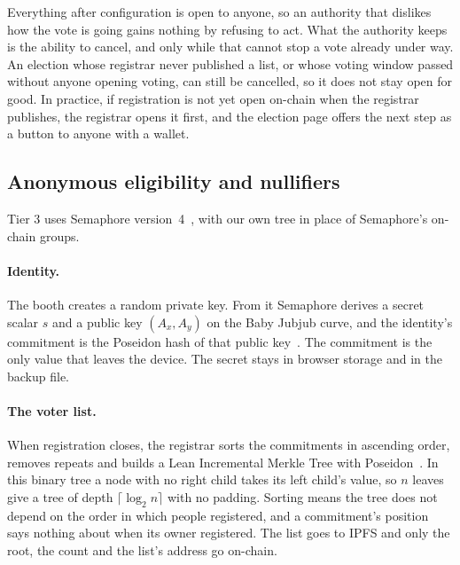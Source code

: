 Everything after configuration is open to anyone, so an authority that
dislikes how the vote is going gains nothing by refusing to act. What the
authority keeps is the ability to cancel, and only while that cannot stop a
vote already under way. An election whose registrar never published a list,
or whose voting window passed without anyone opening voting, can still be
cancelled, so it does not stay open for good. In practice, if registration is
not yet open on-chain when the registrar publishes, the registrar opens it
first, and the election page offers the next step as a button to anyone with a
wallet.

\subsection{Anonymous eligibility and nullifiers}\label{sec:zk}

Tier 3 uses Semaphore version~4~\cite{semaphore}, with our own tree in place of
Semaphore's on-chain groups.

\paragraph{Identity.} The booth creates a random private key. From it
Semaphore derives a secret scalar $s$ and a public key $(A_x, A_y)$ on the
Baby Jubjub curve, and the identity's commitment is the Poseidon hash of that
public key~\cite{semaphorecircuit}. The commitment is the only value that
leaves the device. The secret stays in browser storage and in the backup file.

\paragraph{The voter list.} When registration closes, the registrar sorts the
commitments in ascending order, removes repeats and builds a Lean Incremental
Merkle Tree with Poseidon~\cite{leanimt}. In this binary tree a node with no
right child takes its left child's value, so $n$ leaves give a tree of depth
$\lceil \log_2 n \rceil$ with no padding. Sorting means the tree does not
depend on the order in which people registered, and a commitment's position
says nothing about when its owner registered. The list goes to IPFS and only
the root, the count and the list's address go on-chain.

